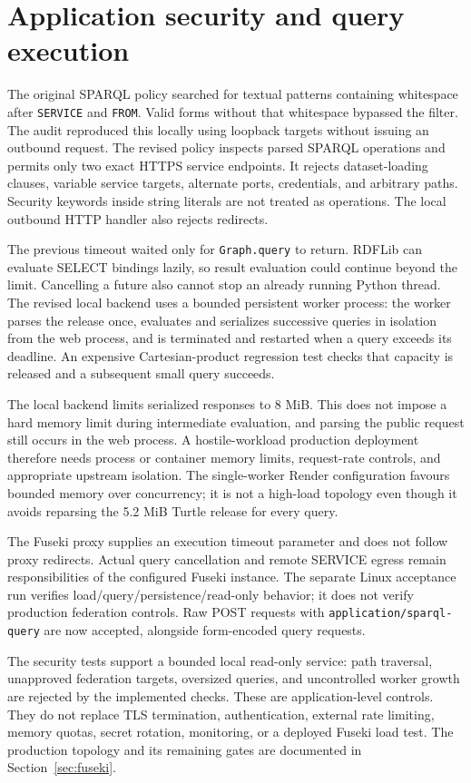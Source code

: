 \documentclass[11pt,a4paper]{article}
\newcommand{\term}[1]{\texttt{#1}}
\begin{document}
\section{Application security and query execution}
The original SPARQL policy searched for textual patterns containing whitespace after
\term{SERVICE} and \term{FROM}. Valid forms without that whitespace bypassed the filter.
The audit reproduced this locally using loopback targets without issuing an outbound
request. The revised policy inspects parsed SPARQL operations and permits only two exact
HTTPS service endpoints. It rejects dataset-loading clauses, variable service targets,
alternate ports, credentials, and arbitrary paths. Security keywords inside string
literals are not treated as operations. The local outbound HTTP handler also rejects
redirects.

The previous timeout waited only for \term{Graph.query} to return. RDFLib can evaluate
SELECT bindings lazily, so result evaluation could continue beyond the limit.
Cancelling a future also cannot stop an already running Python thread. The revised local
backend uses a bounded persistent worker process: the worker parses the release once,
evaluates and serializes successive queries in isolation from the web process, and is
terminated and restarted when a query exceeds its deadline. An expensive Cartesian-product
regression test checks that capacity is released and a subsequent small query succeeds.

The local backend limits serialized responses to 8 MiB. This does not impose a hard
memory limit during intermediate evaluation, and parsing the public request still occurs
in the web process. A hostile-workload production deployment therefore needs process or
container memory limits, request-rate controls, and appropriate upstream isolation. The
single-worker Render configuration favours bounded memory over concurrency; it is not a
high-load topology even though it avoids reparsing the 5.2 MiB Turtle release for every query.

The Fuseki proxy supplies an execution timeout parameter and does not follow proxy
redirects. Actual query cancellation and remote SERVICE egress remain responsibilities
of the configured Fuseki instance. The separate Linux acceptance run verifies load/query/persistence/read-only behavior;
it does not verify production federation controls. Raw POST requests with \term{application/sparql-query} are now accepted,
alongside form-encoded query requests.

The security tests support a bounded local read-only service: path traversal, unapproved
federation targets, oversized queries, and uncontrolled worker growth are rejected by the
implemented checks. These are application-level controls. They do not replace TLS termination,
authentication, external rate limiting, memory quotas, secret rotation, monitoring, or a
deployed Fuseki load test. The production topology and its remaining gates are documented in
Section~\ref{sec:fuseki}.
\end{document}
